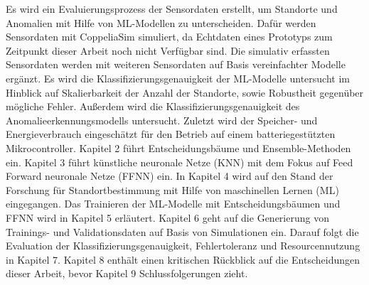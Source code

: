 Es wird ein Evaluierungsprozess der Sensordaten erstellt, um Standorte und Anomalien mit Hilfe von ML-Modellen zu unterscheiden.
Dafür werden Sensordaten mit CoppeliaSim simuliert, da Echtdaten eines Prototyps zum Zeitpunkt dieser Arbeit noch nicht Verfügbar sind.
Die simulativ erfassten Sensordaten werden mit weiteren Sensordaten auf Basis vereinfachter Modelle ergänzt.
Es wird die Klassifizierungsgenauigkeit der ML-Modelle untersucht im Hinblick auf Skalierbarkeit der Anzahl der Standorte, sowie Robustheit gegenüber mögliche Fehler.
Außerdem wird die Klassifizierungsgenauigkeit des Anomalieerkennungsmodells untersucht.
Zuletzt wird der Speicher- und Energieverbrauch eingeschätzt für den Betrieb auf einem batteriegestützten Mikrocontroller.
\newline
\newline
Kapitel 2 führt Entscheidungsbäume und Ensemble-Methoden ein.
Kapitel 3 führt künstliche neuronale Netze (KNN) mit dem Fokus auf Feed Forward neuronale Netze (FFNN) ein.
In Kapitel 4 wird auf den Stand der Forschung für Standortbestimmung mit Hilfe von maschinellen Lernen (ML) eingegangen.
Das Trainieren der ML-Modelle mit Entscheidungsbäumen und FFNN wird in Kapitel 5 erläutert.
Kapitel 6 geht auf die Generierung von Trainings- und Validationsdaten auf Basis von Simulationen ein.
Darauf folgt die Evaluation der Klassifizierungsgenauigkeit, Fehlertoleranz und Resourcennutzung in Kapitel 7.
Kapitel 8 enthält einen kritischen Rückblick auf die Entscheidungen dieser Arbeit, bevor Kapitel 9 Schlussfolgerungen zieht.